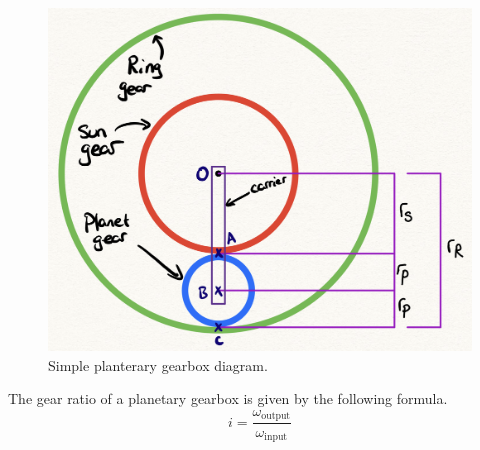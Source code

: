 \documentclass[12pt]{article}
\numberwithin{equation}{section}
\begin{document}
\begin{flushleft}
\begin{figure}[h]
  \centering
  \includegraphics[width = 0.7 \textwidth]{./img/GearRadii.png}
  \caption{Simple planterary gearbox diagram.}
  \label{SystemRadii}
\end{figure}

The gear ratio of a planetary gearbox is given by the following formula.
\begin{equation}
  i = \frac{\omega_{\textrm{output}}}{\omega_{\textrm{input}}}
  \label{gearRatio}
\end{equation}

\end{flushleft}
\end{document}
